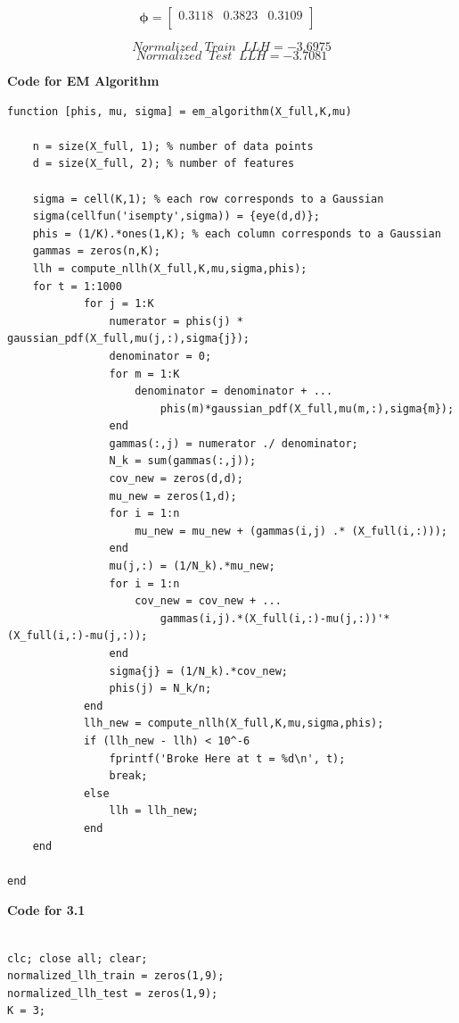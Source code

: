 \documentclass[english]{article}
\begin{document}
\begin{enumerate}
\begin{enumerate}
	\begin{equation*}
	\bm{\phi} = 
	\begin{bmatrix}
	0.3118&0.3823&0.3109\\
    	\end{bmatrix}~~~
	\end{equation*}
	
	$$Normalized \;\; Train \;\; LLH = -3.6975$$
	$$Normalized \;\; Test \;\; LLH = -3.7081$$
	
	\textbf{Code for EM Algorithm}
	\color{black}
	\begin{verbatim}
function [phis, mu, sigma] = em_algorithm(X_full,K,mu)

    n = size(X_full, 1); % number of data points
    d = size(X_full, 2); % number of features

    sigma = cell(K,1); % each row corresponds to a Gaussian
    sigma(cellfun('isempty',sigma)) = {eye(d,d)};
    phis = (1/K).*ones(1,K); % each column corresponds to a Gaussian
    gammas = zeros(n,K);
    llh = compute_nllh(X_full,K,mu,sigma,phis);
    for t = 1:1000
            for j = 1:K
                numerator = phis(j) * gaussian_pdf(X_full,mu(j,:),sigma{j});
                denominator = 0;
                for m = 1:K
                    denominator = denominator + ...
                        phis(m)*gaussian_pdf(X_full,mu(m,:),sigma{m});
                end
                gammas(:,j) = numerator ./ denominator;
                N_k = sum(gammas(:,j));
                cov_new = zeros(d,d);
                mu_new = zeros(1,d);
                for i = 1:n
                    mu_new = mu_new + (gammas(i,j) .* (X_full(i,:)));
                end
                mu(j,:) = (1/N_k).*mu_new;
                for i = 1:n
                    cov_new = cov_new + ...
                        gammas(i,j).*(X_full(i,:)-mu(j,:))'*(X_full(i,:)-mu(j,:));
                end
                sigma{j} = (1/N_k).*cov_new;
                phis(j) = N_k/n;
            end
            llh_new = compute_nllh(X_full,K,mu,sigma,phis);
            if (llh_new - llh) < 10^-6
                fprintf('Broke Here at t = %d\n', t);
                break;
            else
                llh = llh_new;
            end
    end
    
end
	\end{verbatim}
	\vspace{5mm}
	\noindent\textbf{Code for 3.1}
	\color{black}
	\begin{verbatim}
	
clc; close all; clear;
normalized_llh_train = zeros(1,9);
normalized_llh_test = zeros(1,9);
K = 3;


\end{verbatim}
\end{enumerate}
\end{enumerate}
\end{document}
